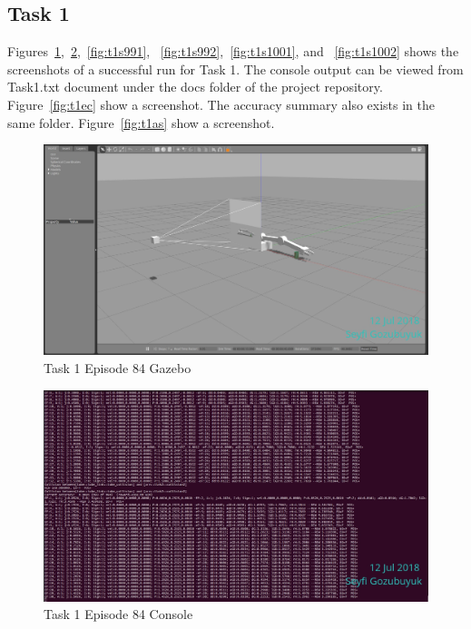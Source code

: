 \documentclass[10pt,journal,compsoc]{IEEEtran}
\begin{document}
\subsection{Task 1}
Figures~\ref{fig:t1s841},~\ref{fig:t1s842},~\ref{fig:t1s991}, ~\ref{fig:t1s992},~\ref{fig:t1s1001}, and ~\ref{fig:t1s1002} shows the screenshots of a successful run for Task 1. The console output can be viewed from Task1.txt document under the docs folder of the project repository\cite{git:t1c}. Figure~\ref{fig:t1ec} show a screenshot. The accuracy summary also exists in the same folder\cite{git:t1a}. Figure~\ref{fig:t1as} show a screenshot.
\begin{figure}[thpb]
      \centering
      \includegraphics[width=\linewidth]{figures/Task1_Step84_1.png}
      \caption{Task 1 Episode 84 Gazebo}
      \label{fig:t1s841}
\end{figure}

\begin{figure}[thpb]
      \centering
      \includegraphics[width=\linewidth]{figures/Task1_Step84_2.png}
      \caption{Task 1 Episode 84 Console}
      \label{fig:t1s842}
\end{figure}
\end{document}
